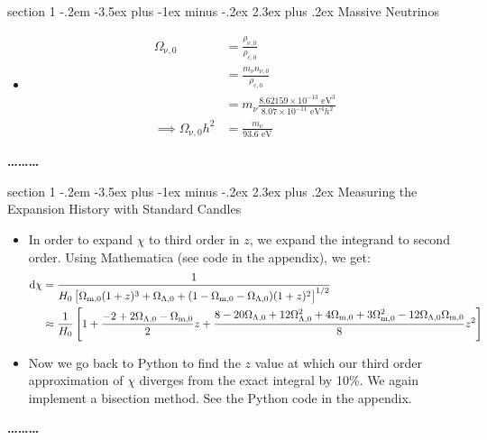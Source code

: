 \documentclass[12pt]{article}
\makeatletter
\newenvironment{problem}{\@startsection
	{section}
	{1}
	{-.2em}
	{-3.5ex plus -1ex minus -.2ex}
	{2.3ex plus .2ex}
	{\pagebreak[3]%
		\large\bf\noindent{Problem }
	}
}
{%
	\begin{center}\large\bf \ldots\ldots\ldots\end{center}}
\newcommand{\Omx}[1]{\ensuremath{\Omega_\mathrm{#1} } }
\newcommand{\rhox}[1]{\ensuremath{\rho_\mathrm{#1} } }
\makeatother
\begin{document}
\begin{problem}{Massive Neutrinos}
\begin{itemize}
		\item \begin{align*}
			\Omx{\nu,0} &= \frac{\rhox{\nu,0}}{\rho_\mathrm{c,0}}
			\\
			&= \frac{m_\nu n_{\nu,0}}{\rho_\mathrm{c,0}}
			\\
			&= m_\nu \frac{ 8.62159\times 10^{-13} \text{ eV}^3}{8.07\times 10^{-11} \text{ eV}^4 h^2}
			\\
			\implies \Omx{\nu,0} h^2 &= \frac{ m_\nu}{ 93.6 \text{ eV}}
		\end{align*}
	\end{itemize}
		
	\end{problem}
	
	\begin{problem}{Measuring the Expansion History with Standard Candles}
		\begin{itemize}
			\item In order to expand $\chi$ to third order in $z$, we expand the integrand to second order.  Using Mathematica (see code in the appendix), we get: \begin{align*}
				\dif\chi &= \frac{1}{H_0 \left[ \Omx{m,0}(1+z)^3 + \Omx{\Lambda,0} + (1 - \Omx{m,0} - \Omx{\Lambda,0})(1+z)^2 \right]^{1/2}}
				\\
				&\approx \frac{1}{H_0} \left[1 + \frac{-2 + 2 \Omx{\Lambda,0} - \Omx{m,0}}{2} z + \frac{8 - 20 \Omx{\Lambda,0} + 12 \Omx{\Lambda,0}^2 + 4\Omx{m,0}  + 3\Omx{m,0}^2 - 12\Omx{\Lambda,0}\Omx{m,0} }{8} z^2 \right] 
			\end{align*}
			
			\item Now we go back to Python to find the $z$ value at which our third order approximation of $\chi$ diverges from the exact integral by 10\%.  We again implement a bisection method.  See the Python code in the appendix.
			

\end{itemize}
\end{problem}
\end{document}
